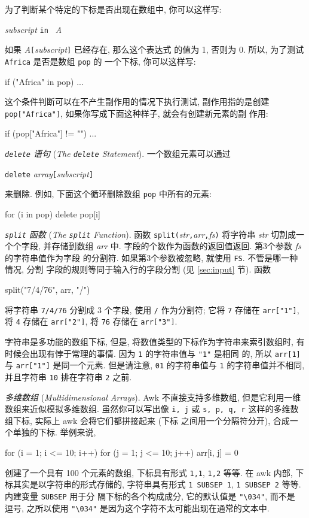 为了判断某个特定的下标是否出现在数组中, 你可以这样写:
\begin{pattern}
    \textit{subscript} \verb'in ' \textit{A}
\end{pattern}
如果 \textit{A}\verb'['\textit{subscript}\verb']' 已经存在, 那么这个表达式
的值为 1, 否则为 0. 所以, 为了测试 \verb'Africa' 是否是数组 \verb'pop' 的
一个下标, 你可以这样写:
\begin{myverb}
    if ("Africa" in pop) ...
\end{myverb}
这个条件判断可以在不产生副作用的情况下执行测试, 副作用指的是创建
\verb'pop["Africa"]', 如果你写成下面这种样子, 就会有创建新元素的副
作用:
\begin{myverb}
    if (pop["Africa"] != "") ...
\end{myverb}
\emph{\texttt{delete} 语句} (\emph{The \texttt{delete} Statement}).
一个数组元素可以通过
\begin{pattern}
    \verb'delete' \textit{array}\verb'['\textit{subscript}\verb']'
\end{pattern}
来删除. 例如, 下面这个循环删除数组 \verb'pop' 中所有的元素:
\begin{myverb}
    for (i in pop)
        delete pop[i]
\end{myverb}

\emph{\texttt{split} 函数} (\emph{The \texttt{split} Function}). 函数
\verb'split('\textit{str}\verb','\textit{arr}\verb','\textit{fs}\verb')'
将字符串 \textit{str} 切割成一个个字段, 并存储到数组 \textit{arr} 中.
字段的个数作为函数的返回值返回. 第3个参数 \textit{fs} 的字符串值作为字段
的分割符. 如果第3个参数被忽略, 就使用 \verb'FS'. 不管是哪一种情况, 分割
字段的规则等同于输入行的字段分割 (见 \ref{sec:input} 节). 函数
\begin{myverb}
    split("7/4/76", arr, "/")
\end{myverb}
将字符串 \verb'7/4/76' 分割成 3 个字段, 使用 \verb'/' 作为分割符; 它将
\verb'7' 存储在 \verb'arr["1"]', 将 \verb'4' 存储在 \verb'arr["2"]',
将 \verb'76' 存储在 \verb'arr["3"]'.

字符串是多功能的数组下标, 但是, 将数值类型的下标作为字符串来索引数组时,
有时候会出现有悖于常理的事情. 因为 \verb'1' 的字符串值与 \verb'"1"' 是相同
的, 所以 \verb'arr[1]' 与 \verb'arr["1"]' 是同一个元素. 但是请注意,
\verb'01' 的字符串值与 \verb'1' 的字符串值并不相同, 并且字符串 \verb'10'
排在字符串 \verb'2' 之前.

\emph{多维数组} (\emph{Multidimensional Arrays}). Awk 不直接支持多维数组,
但是它利用一维数组来近似模拟多维数组. 虽然你可以写出像 \verb'i, j' 或
\verb's, p, q, r' 这样的多维数组下标, 实际上 awk 会将它们都拼接起来 (下标
之间用一个分隔符分开), 合成一个单独的下标. 举例来说,
\begin{myverb}
    for (i = 1; i <= 10; i++)
        for (j = 1; j <= 10; j++)
            arr[i, j] = 0
\end{myverb}
创建了一个具有 100 个元素的数组, 下标具有形式 \verb'1,1', \verb'1,2' 等等.
在 awk 内部, 下标其实是以字符串的形式存储的, 字符串具有形式
\verb'1 SUBSEP 1', \verb'1 SUBSEP 2' 等等. 内建变量 \verb'SUBSEP' 用于分
隔下标的各个构成成分, 它的默认值是 \verb'"\034"', 而不是 逗号, 之所以使用
\verb'"\034"' 是因为这个字符不太可能出现在通常的文本中.

